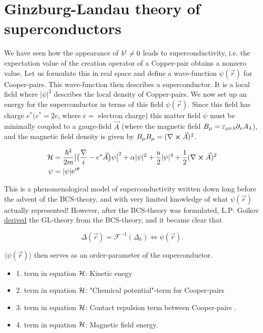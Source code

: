 \section[Ginzburg-Landau]{Ginzburg-Landau theory of superconductors}

We have seen how the appearance of $b^{\dagger} \neq 0$ leads to superconductivity, i.e. the expectation value of the creation operator of a Copper-pair obtains a nonzero value. Let us formulate this in real space and define a wave-function $\psi(\vec{r}) $ for Cooper-pairs. This wave-function then describes a superconductor. It is a local field where $|\psi|^2$ describes the local density of Copper-pairs. We now set up an energy for the superconductor in terms of this field $\psi(\vec{r})$. Since this field has charge $e^* (e^* = 2e$, where $e =$ electron charge) this matter field $\psi$ must be minimally coupled to a gauge-field $\vec{A}$ (where the magnetic field $B_\mu = \varepsilon_{\mu\nu\lambda} \partial_\nu A_\lambda$), and the magnetic field density is given by $B_\mu B_\mu = (\nabla \cross \vec{A} )^2$.


\begin{equation}
\begin{aligned}
\mathcal{H}  &= \frac{\hbar^2}{2m} \big|\big(\frac{\nabla}{i} - e^*\vec{A}\big)\psi \big|^2 + \alpha |\psi|^2 + \frac{u}{2} |\psi|^4 + \frac{1}{2}(\nabla \cross \vec{A} )^2 \\
\psi &= |\psi| \mathrm{e}^{i\theta}
\label{Ham_ginz_lan}
\end{aligned}
\end{equation}

This is a phenomenological model of superconductivity written down long before the advent of the BCS-theory, and with very limited knowledge of what $\psi(\vec{r})$ actually represented! However, after the BCS-theory was formulated, L.P: Goikov \underline{derived} the GL-theory from the BCS-theory, and it became clear that

\begin{equation}
\Delta (\vec{r}) = \mathcal{F}^{-1}(\Delta_k) \iff \psi(\vec{r}).
\label{gap_fourrier}
\end{equation}

$\langle \psi(\vec{r}) \rangle$ then serves as an order-parameter of the superconductor.

\begin{itemize}
\item 1. term in equation $\mathcal{H}$: Kinetic enegy
\item 2. term in equation $\mathcal{H}$: "Chemical potential"-term for Cooper-pairs
\item 3. term in equation $\mathcal{H}$: Contact repulsion term between Cooper-pairs .
\item 4. term in equation $\mathcal{H}$: Magnetic field energy.
\end{itemize}

